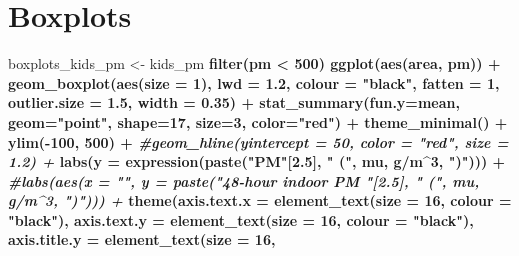 \documentclass[
]{article}
\newenvironment{Shaded}{\begin{snugshade}}{\end{snugshade}}
\newcommand{\CommentTok}[1]{\textcolor[rgb]{0.56,0.35,0.01}{\textit{#1}}}
\newcommand{\DataTypeTok}[1]{\textcolor[rgb]{0.13,0.29,0.53}{#1}}
\newcommand{\DecValTok}[1]{\textcolor[rgb]{0.00,0.00,0.81}{#1}}
\newcommand{\FloatTok}[1]{\textcolor[rgb]{0.00,0.00,0.81}{#1}}
\newcommand{\KeywordTok}[1]{\textcolor[rgb]{0.13,0.29,0.53}{\textbf{#1}}}
\newcommand{\NormalTok}[1]{#1}
\newcommand{\OperatorTok}[1]{\textcolor[rgb]{0.81,0.36,0.00}{\textbf{#1}}}
\newcommand{\StringTok}[1]{\textcolor[rgb]{0.31,0.60,0.02}{#1}}
\begin{document}
\hypertarget{boxplots}{%
\section{Boxplots}\label{boxplots}}

\begin{Shaded}
\begin{Highlighting}[]
\NormalTok{boxplots_kids_pm <-}\StringTok{ }\NormalTok{kids_pm }\OperatorTok{%>%}\StringTok{ }
\StringTok{  }\KeywordTok{filter}\NormalTok{(pm }\OperatorTok{<}\StringTok{ }\DecValTok{500}\NormalTok{) }\OperatorTok{%>%}\StringTok{ }
\StringTok{  }\KeywordTok{ggplot}\NormalTok{(}\KeywordTok{aes}\NormalTok{(area, pm)) }\OperatorTok{+}
\StringTok{    }\KeywordTok{geom_boxplot}\NormalTok{(}\KeywordTok{aes}\NormalTok{(}\DataTypeTok{size =} \DecValTok{1}\NormalTok{), }\DataTypeTok{lwd =} \FloatTok{1.2}\NormalTok{, }\DataTypeTok{colour =} \StringTok{"black"}\NormalTok{, }
               \DataTypeTok{fatten =} \DecValTok{1}\NormalTok{, }\DataTypeTok{outlier.size =} \FloatTok{1.5}\NormalTok{, }\DataTypeTok{width =} \FloatTok{0.35}\NormalTok{) }\OperatorTok{+}
\StringTok{    }\KeywordTok{stat_summary}\NormalTok{(}\DataTypeTok{fun.y=}\NormalTok{mean, }\DataTypeTok{geom=}\StringTok{"point"}\NormalTok{, }\DataTypeTok{shape=}\DecValTok{17}\NormalTok{, }\DataTypeTok{size=}\DecValTok{3}\NormalTok{, }\DataTypeTok{color=}\StringTok{"red"}\NormalTok{) }\OperatorTok{+}
\StringTok{    }\KeywordTok{theme_minimal}\NormalTok{() }\OperatorTok{+}
\StringTok{    }\KeywordTok{ylim}\NormalTok{(}\OperatorTok{-}\DecValTok{100}\NormalTok{, }\DecValTok{500}\NormalTok{) }\OperatorTok{+}
\StringTok{    }\CommentTok{#geom_hline(yintercept = 50, color = "red", size = 1.2) +}
\StringTok{    }\KeywordTok{labs}\NormalTok{(}\DataTypeTok{y =} \KeywordTok{expression}\NormalTok{(}\KeywordTok{paste}\NormalTok{(}\StringTok{"PM"}\NormalTok{[}\FloatTok{2.5}\NormalTok{], }\StringTok{" ("}\NormalTok{, mu, g}\OperatorTok{/}\NormalTok{m}\OperatorTok{^}\DecValTok{3}\NormalTok{, }\StringTok{")"}\NormalTok{))) }\OperatorTok{+}
\StringTok{    }\CommentTok{#labs(aes(x = "", y = paste("48-hour indoor PM "[2.5], " (", mu, g/m^3, ")"))) +}
\StringTok{    }\KeywordTok{theme}\NormalTok{(}\DataTypeTok{axis.text.x =} \KeywordTok{element_text}\NormalTok{(}\DataTypeTok{size =} \DecValTok{16}\NormalTok{, }\DataTypeTok{colour =} \StringTok{"black"}\NormalTok{),}
          \DataTypeTok{axis.text.y =} \KeywordTok{element_text}\NormalTok{(}\DataTypeTok{size =} \DecValTok{16}\NormalTok{, }\DataTypeTok{colour =} \StringTok{"black"}\NormalTok{),}
          \DataTypeTok{axis.title.y =} \KeywordTok{element_text}\NormalTok{(}\DataTypeTok{size =} \DecValTok{16}\NormalTok{,}
}}
\end{Highlighting}
\end{Shaded}
\end{document}

